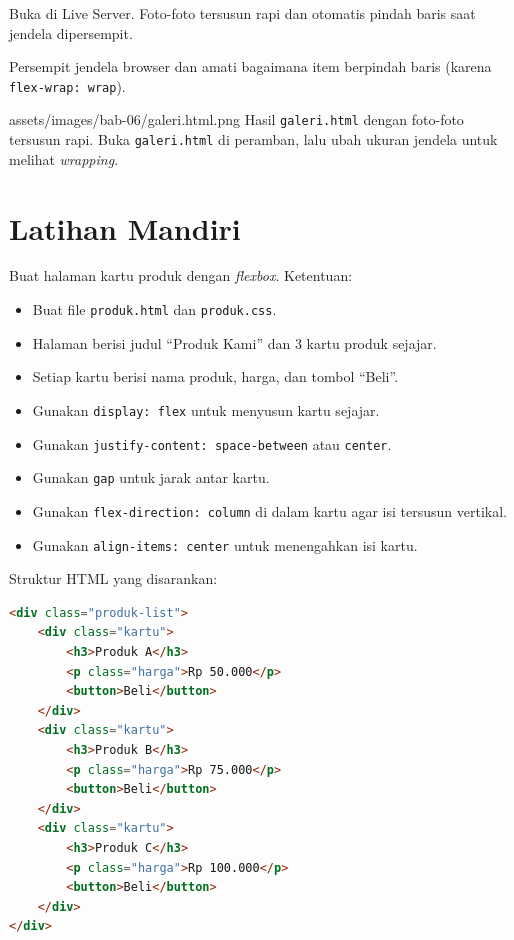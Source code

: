 \begin{langkah}
  \item Buka di Live Server. Foto-foto tersusun rapi dan otomatis pindah baris saat jendela dipersempit.
  \item Persempit jendela browser dan amati bagaimana item berpindah baris (karena \texttt{flex-wrap: wrap}).
\end{langkah}

\begin{tangkapanlayar}
  {assets/images/bab-06/galeri.html.png}
  {Hasil \texttt{galeri.html} dengan foto-foto tersusun rapi.}
  {Buka \texttt{galeri.html} di peramban, lalu ubah ukuran jendela untuk melihat \emph{wrapping}.}
\end{tangkapanlayar}

\section{Latihan Mandiri}
\label{sec:flex-latihan}

\begin{latihan}
Buat halaman kartu produk dengan \emph{flexbox}. Ketentuan:
\begin{itemize}
  \item Buat file \texttt{produk.html} dan \texttt{produk.css}.
  \item Halaman berisi judul ``Produk Kami'' dan 3 kartu produk sejajar.
  \item Setiap kartu berisi nama produk, harga, dan tombol ``Beli''.
  \item Gunakan \texttt{display: flex} untuk menyusun kartu sejajar.
  \item Gunakan \texttt{justify-content: space-between} atau \texttt{center}.
  \item Gunakan \texttt{gap} untuk jarak antar kartu.
  \item Gunakan \texttt{flex-direction: column} di dalam kartu agar isi tersusun vertikal.
  \item Gunakan \texttt{align-items: center} untuk menengahkan isi kartu.
\end{itemize}
\end{latihan}

Struktur HTML yang disarankan:

\begin{lstlisting}[language=HTML, caption={Kerangka kartu produk}, label={lst:produk-kartu}]
<div class="produk-list">
    <div class="kartu">
        <h3>Produk A</h3>
        <p class="harga">Rp 50.000</p>
        <button>Beli</button>
    </div>
    <div class="kartu">
        <h3>Produk B</h3>
        <p class="harga">Rp 75.000</p>
        <button>Beli</button>
    </div>
    <div class="kartu">
        <h3>Produk C</h3>
        <p class="harga">Rp 100.000</p>
        <button>Beli</button>
    </div>
</div>
\end{lstlisting}

